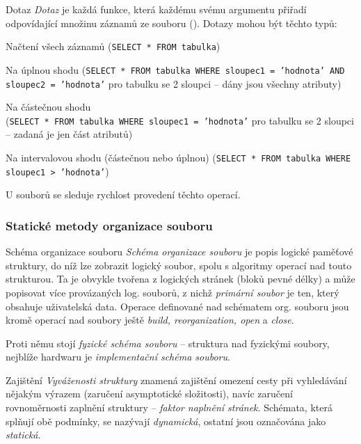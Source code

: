 \begin{definiceN}{Dotaz}
\emph{Dotaz} je každá funkce, která každému svému argumentu přiřadí odpovídající množinu záznamů ze souboru (). Dotazy mohou být těchto typů:
\begin{pitemize}
    \item Načtení všech záznamů ({\tt SELECT * FROM tabulka})
    \item Na úplnou shodu ({\tt SELECT * FROM tabulka WHERE sloupec1 = 'hodnota' AND sloupec2 = 'hodnota'} pro tabulku se 2 sloupci -- dány jsou všechny atributy)
    \item Na částečnou shodu\\({\tt SELECT * FROM tabulka WHERE sloupec1 = 'hodnota'} pro tabulku se 2 sloupci -- zadaná je jen část atributů)
    \item Na intervalovou shodu (částečnou nebo úplnou) ({\tt SELECT * FROM tabulka WHERE sloupec1 > 'hodnota'})
\end{pitemize}
U souborů se sleduje rychlost provedení těchto operací.
\end{definiceN}


\subsubsection*{Statické metody organizace souboru}

\begin{definiceN}{Schéma organizace souboru}
\emph{Schéma organizace souboru} je popis logické paměťové struktury, do níž lze zobrazit logický soubor, spolu s algoritmy operací nad touto strukturou. Ta je obvykle tvořena z logických stránek (bloků pevné délky) a může popisovat více provázaných log. souborů, z nichž \emph{primární soubor} je ten, který obsahuje uživatelská data. Operace definované nad schématem org. souboru jsou kromě operací nad soubory ještě \emph{build, reorganization, open} a \emph{close}.

Proti němu stojí \emph{fyzické schéma souboru} -- struktura nad fyzickými soubory, nejblíže hardwaru je \emph{implementační schéma souboru}.

Zajištění \emph{Vyváženosti struktury} znamená zajištění omezení cesty při vyhledávání nějakým výrazem (zaručení asymptotické složitosti), navíc zaručení rovnoměrnosti zaplnění struktury -- \emph{faktor naplnění stránek}. Schémata, která splňují obě podmínky, se nazývají \emph{dynamická}, ostatní jsou označována jako \emph{statická}.
\end{definiceN}

